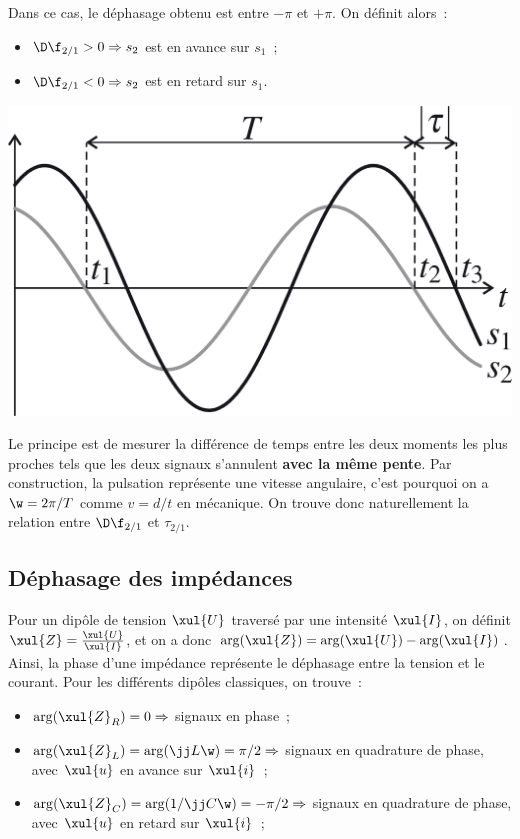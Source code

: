 \documentclass[../../main/main.tex]{subfiles}
\begin{document}
\begin{minipage}{0.70\linewidth}
	Dans ce cas, le déphasage obtenu est entre $-\pi$ et $+\pi$. On définit alors~:
	\begin{itemize}
		\item $\D\f_{2/1} > 0 \Rightarrow s_2$ est en avance sur $s_1$~;
		\item $\D\f_{2/1} < 0 \Rightarrow s_2$ est en retard sur $s_1$.
	\end{itemize}
\end{minipage}
\begin{minipage}{0.30\linewidth}
	\begin{center}
		\includegraphics[width=\linewidth]{dfretard}
	\end{center}
\end{minipage}

Le principe est de mesurer la différence de temps entre les deux moments les
plus proches tels que les deux signaux s'annulent \textbf{avec la même pente}.
Par construction, la pulsation représente une vitesse angulaire, c'est pourquoi
on a $\w = 2\pi/T$ comme $v = d/t$ en mécanique. On trouve donc naturellement la
relation entre $\D\f_{2/1}$ et $\tau_{2/1}$.

\subsection{Déphasage des impédances}
Pour un dipôle de tension $\xul{U}$ traversé par une intensité $\xul{I}$, on
définit $\xul{Z} = \frac{\xul{U}}{\xul{I}}$, et on a donc $\arg(\xul{Z}) =
	\arg(\xul{U}) - \arg(\xul{I})$. Ainsi, la phase d'une impédance représente le
déphasage entre la tension et le courant. Pour les différents dipôles
classiques, on trouve~:
\begin{itemize}
	\item $\arg(\xul{Z}_R) = 0 \Rightarrow$ signaux en phase~;
	\item $\arg(\xul{Z}_L) = \arg(\jj L\w) = \pi/2 \Rightarrow$ signaux en
	      quadrature de phase, avec $\xul{u}$ en avance sur $\xul{i}$~;
	\item $\arg(\xul{Z}_C) = \arg(1/\jj C\w) = -\pi/2 \Rightarrow$ signaux en
	      quadrature de phase, avec $\xul{u}$ en retard sur $\xul{i}$~;
\end{itemize}
\end{document}
